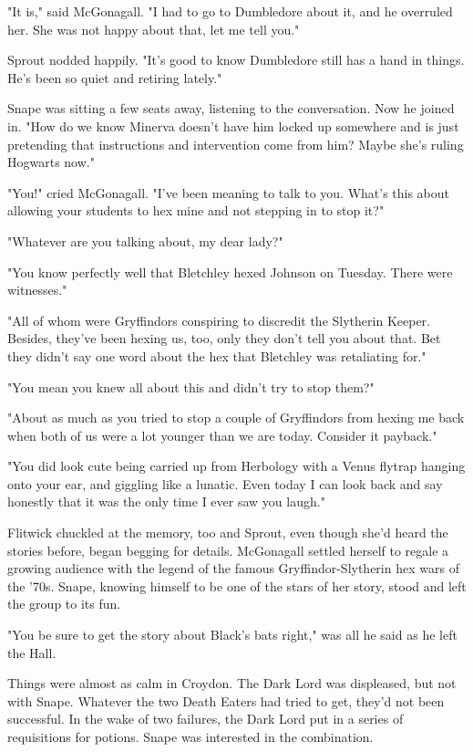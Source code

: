"It is," said McGonagall. "I had to go to Dumbledore about it, and he overruled her. She was not happy about that, let me tell you."

Sprout nodded happily. "It's good to know Dumbledore still has a hand in things. He's been so quiet and retiring lately."

Snape was sitting a few seats away, listening to the conversation. Now he joined in. "How do we know Minerva doesn't have him locked up somewhere and is just pretending that instructions and intervention come from him? Maybe she's ruling Hogwarts now."

"You!" cried McGonagall. "I've been meaning to talk to you. What's this about allowing your students to hex mine and not stepping in to stop it?"

"Whatever are you talking about, my dear lady?"

"You know perfectly well that Bletchley hexed Johnson on Tuesday. There were witnesses."

"All of whom were Gryffindors conspiring to discredit the Slytherin Keeper. Besides, they've been hexing us, too, only they don't tell you about that. Bet they didn't say one word about the hex that Bletchley was retaliating for."

"You mean you knew all about this and didn't try to stop them?"

"About as much as you tried to stop a couple of Gryffindors from hexing me back when both of us were a lot younger than we are today. Consider it payback."

"You did look cute being carried up from Herbology with a Venus flytrap hanging onto your ear, and giggling like a lunatic. Even today I can look back and say honestly that it was the only time I ever saw you laugh."

Flitwick chuckled at the memory, too and Sprout, even though she'd heard the stories before, began begging for details. McGonagall settled herself to regale a growing audience with the legend of the famous Gryffindor-Slytherin hex wars of the '70s. Snape, knowing himself to be one of the stars of her story, stood and left the group to its fun.

"You be sure to get the story about Black's bats right," was all he said as he left the Hall.

Things were almost as calm in Croydon. The Dark Lord was displeased, but not with Snape. Whatever the two Death Eaters had tried to get, they'd not been successful. In the wake of two failures, the Dark Lord put in a series of requisitions for potions. Snape was interested in the combination.

